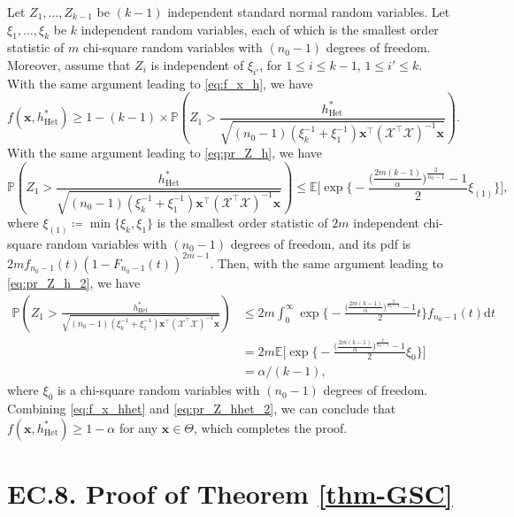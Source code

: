\documentclass[ijoc,nonblindrev]{informs3}
\def\E{\mathbb{E}}
\def\pr{\mathbb{P}}
\def\ud{\mathrm{d}}
\def\bx{{\bm x}}
\def\cX{{\mathcal X}}
\def\hhet{h_{\mathrm{Het}}}
\begin{document}
Let $Z_1,\ldots,Z_{k-1}$ be $(k-1)$ independent standard normal random variables.
Let $\xi_1,\ldots,\xi_k$ be $k$ independent random variables, each of which is the smallest order statistic of $m$ chi-square random variables with $(n_0-1)$ degrees of freedom.
Moreover, assume that $Z_i$ is independent of $\xi_{i'}$, for $1\leq i \leq k-1$, $1\leq i' \leq k$.
With the same argument leading to \eqref{eq:f_x_h}, we have
\begin{equation}\label{eq:f_x_hhet}
f(\bx,\hhet^*) \geq 1 - (k-1) \times \pr \left(Z_1 > \frac{\hhet^*}{\sqrt{(n_0-1) (\xi_k^{-1}+\xi_1^{-1})\bx^\intercal (\cX^\intercal \cX)^{-1} \bx}} \right).
\end{equation}
With the same argument leading to \eqref{eq:pr_Z_h}, we have
\begin{equation*} \label{eq:pr_Z_hhet}
\pr \left(Z_1 > \frac{\hhet^*}{\sqrt{(n_0-1) (\xi_k^{-1}+\xi_1^{-1})\bx^\intercal (\cX^\intercal \cX)^{-1} \bx}} \right) \leq \E \Bigg[\exp\Bigg\{-\frac{\big(\frac{2m(k-1)}{\alpha}\big)^{\frac{2}{n_0-1}}-1}{2} \xi_{(1)}\Bigg\} \Bigg],
\end{equation*}
where $\xi_{(1)} \coloneqq \min\{\xi_k,\xi_1\}$ is the smallest order statistic of $2m$ independent chi-square random variables with $(n_0-1)$ degrees of freedom, and its pdf is $2m f_{n_0-1}(t)(1-F_{n_0-1}(t))^{2m-1}$.
Then, with the same argument leading to \eqref{eq:pr_Z_h_2}, we have
\begin{align}
\pr \left(Z_1 > \frac{\hhet^*}{\sqrt{(n_0-1) (\xi_k^{-1}+\xi_1^{-1})\bx^\intercal (\cX^\intercal \cX)^{-1} \bx}} \right)
&\leq 2m \int_0^\infty \exp\Bigg\{-\frac{\big(\frac{2m(k-1)}{\alpha}\big)^{\frac{2}{n_0-1}}-1}{2} t\Bigg\} f_{n_0-1}(t) \ud t \nonumber\\
&= 2m \E \Bigg[\exp\Bigg\{-\frac{\big(\frac{2m(k-1)}{\alpha}\big)^{\frac{2}{n_0-1}}-1}{2} \xi_0 \Bigg\} \Bigg] \nonumber\\
&= \alpha/(k-1), \label{eq:pr_Z_hhet_2}
\end{align}
where $\xi_0$ is a chi-square random variables with $(n_0-1)$ degrees of freedom.
Combining \eqref{eq:f_x_hhet} and \eqref{eq:pr_Z_hhet_2}, we can conclude that $f(\bx,\hhet^*)\geq1-\alpha$ for any $\bx\in\Theta$, which completes the proof.\Halmos




\hypertarget{EC.8}{
\section*{EC.8. \hspace{5pt} Proof of Theorem \ref{thm-GSC}}
}
\end{document}

